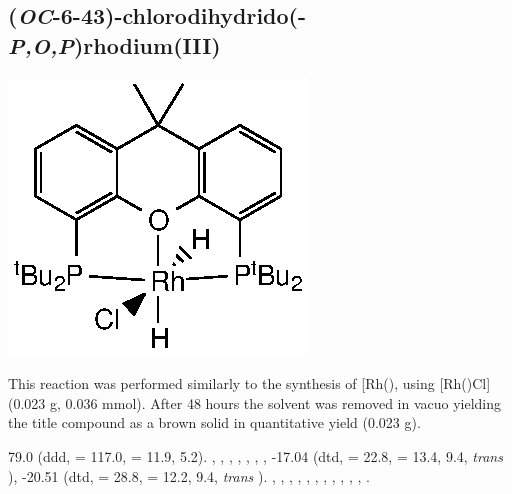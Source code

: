 
\subsection*{(\emph{OC}-6-43)-chlorodihydrido(\tBuxantphosk-\emph{P,O,P})rhodium(III)}

\begin{structure}[h]
\begin{center}
\includegraphics{../Structures/CtBuRhClH2.eps}
\end{center}
\end{structure}

This reaction was performed similarly to the synthesis of [Rh(\tBusixantphos)\ce{Cl(H)2]}, using [Rh(\tBuxantphos)Cl] (0.023 g, 0.036 mmol).  After 48 hours the solvent was removed in vacuo yielding the title compound as a brown solid in quantitative yield (0.023 g).

79.0 (ddd, \JRhP{} = 117.0, \JPH{} = 11.9, 5.2).
,
,
,
,
,
,
,
-17.04 (dtd, \JRhH{} = 22.8, \JPH{} = 13.4, \JHH{} 9.4,  \emph{trans} ),
-20.51 (dtd, \JRhH{} = 28.8, \JPH{} = 12.2, \JHH{} 9.4,  \emph{trans} ).
,
,
,
,
,
,
,
,
,
,
,
.

